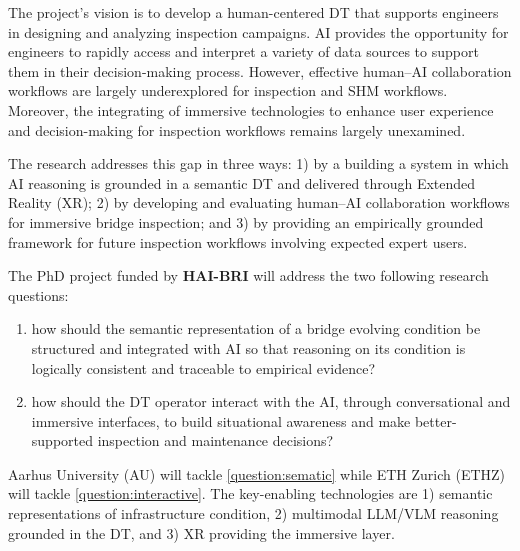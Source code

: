 \documentclass[12pt,a4paper]{article}
\newcommand{\projectname}{\textbf{HAI-BRI }} %
\begin{document}
%
The project's vision is to develop a human-centered DT that supports engineers in designing and analyzing inspection campaigns. %
AI provides the opportunity for engineers to rapidly access and interpret a variety of data sources to support them in their decision-making process. However, effective human--AI collaboration workflows are largely underexplored for inspection and SHM workflows. Moreover, the integrating of immersive technologies to enhance user experience and decision-making for inspection workflows remains largely unexamined. \par
%
The research addresses this gap in three ways: 1) by a building a system in which AI reasoning is grounded in a semantic DT and delivered through Extended Reality (XR); 2) by developing and evaluating human--AI collaboration workflows for immersive bridge inspection; and 3) by providing an empirically grounded framework for future inspection workflows involving expected expert users. \par
%
%
The PhD project funded by \projectname will address the two following research questions:
%
\begin{enumerate}[label=Q\arabic*,nosep]
    \item how should the semantic representation of a bridge evolving condition be structured and integrated with AI so that reasoning on its condition is logically consistent and traceable to empirical evidence? \label{question:sematic}
    \item how should the DT operator interact with the AI, through conversational and immersive interfaces, to build situational awareness and make better-supported inspection and maintenance decisions? \label{question:interactive}
\end{enumerate}
%
Aarhus University (AU) will tackle \ref{question:sematic} while ETH Zurich (ETHZ) will tackle \ref{question:interactive}. The key-enabling technologies are 1) semantic representations of infrastructure condition, 2) multimodal LLM/VLM reasoning grounded in the DT, and 3) XR providing the immersive layer. \par
\end{document}
